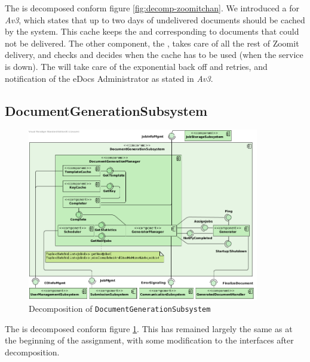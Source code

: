 The  is decomposed conform figure \ref{fig:decomp-zoomitchan}. We introduced a  for \emph{Av3}, which states that up to two days of undelivered documents should be cached by the system. This cache keeps the  and  corresponding to documents that could not be delivered. The other component, the , takes care of all the rest of Zoomit delivery, and checks and decides when the cache has to be used (when the service is down). The  will take care of the exponential back off and retries, and notification of the eDocs Administrator as stated in \emph{Av3}.

\subsection{DocumentGenerationSubsystem}
\begin{figure}[!htp]
    \centering
    \includegraphics[width=0.9\textwidth]{figures/Document Generation Subsystem.png}
    \caption{Decomposition of \texttt{DocumentGenerationSubsystem}}\label{fig:decomp-docgensub}
\end{figure}

The  is decomposed conform figure \ref{fig:decomp-docgensub}. This has remained largely the same as at the beginning of the assignment, with some modification to the interfaces after decomposition.

